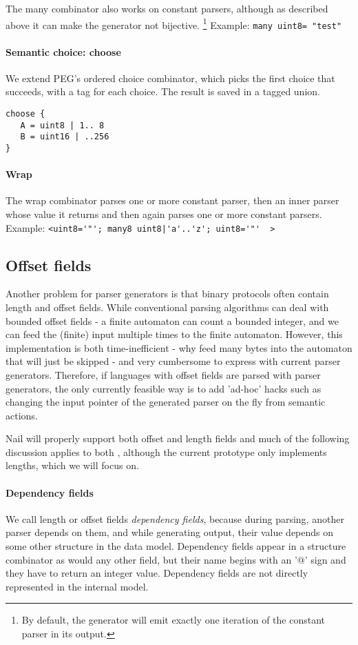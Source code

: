 The many combinator also works on constant parsers, although as described above it can make the
generator not bijective. \footnote{By default, the generator will emit exactly one iteration of the
  constant parser in its output.} Example: \texttt{many uint8= "test"}


\paragraph{Semantic choice: choose}
We extend PEG's ordered choice combinator, which picks the first choice that succeeds, with a tag
for each choice. The result is saved in a tagged union. 

\begin{verbatim}
choose {
   A = uint8 | 1.. 8
   B = uint16 | ..256
}
\end{verbatim}
\paragraph{Wrap}

The wrap combinator parses one or more constant parser, then an inner parser whose value it returns
and then again parses one or more constant parsers.\\ Example: 
\verb+<uint8='"'; many8 uint8|'a'..'z'; uint8='"'  >+

\subsection{Offset fields}
Another problem for parser generators is that binary protocols often contain length and offset
fields. While conventional parsing algorithms can deal with bounded offset fields - a finite
automaton can count a bounded integer, and we can feed the (finite) input multiple times to the
finite automaton. However, this implementation is both time-inefficient - why feed many bytes into
the automaton that will just be skipped - and very cumbersome to express with current parser
generators. Therefore, if languages with offset fields are parsed with parser generators, the only
currently feasible way is to add 'ad-hoc' hacks such as changing the input pointer of the generated
parser on the fly from semantic actions. 

Nail will properly support both offset and length fields and much of the following discussion
applies to both , although the current prototype only implements lengths, which we will focus on. 

\paragraph{Dependency fields}
We call length or offset fields \textit{dependency fields}, because during parsing, another parser
depends on them, and while generating output, their value depends on some other structure in the
data model.
Dependency fields appear in a structure combinator as would any other field, but their name begins
with an '@' sign and they have to return an integer value. Dependency fields are not directly
represented in the internal model. 

